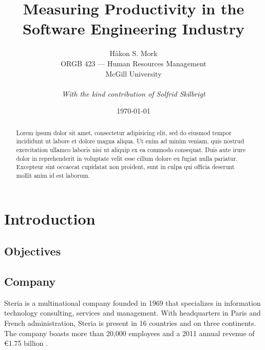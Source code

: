 \documentclass[letterpaper, 12pt]{report}
\title{\Huge \textbf{%
Measuring Productivity in the Software Engineering Industry}}
\author{
	Håkon S. Mork \\ 
	ORGB 423 --- Human Resources Management \\ 
	McGill University \\
	\\
	\emph{With the kind contribution of Solfrid Skilbrigt}
}
\date{\today}
\begin{document}
\maketitle

\begin{abstract}
Lorem ipsum dolor sit amet, consectetur adipisicing elit, sed do eiusmod tempor incididunt ut labore et dolore magna aliqua. Ut enim ad minim veniam, quis nostrud exercitation ullamco laboris nisi ut aliquip ex ea commodo consequat. Duis aute irure dolor in reprehenderit in voluptate velit esse cillum dolore eu fugiat nulla pariatur. Excepteur sint occaecat cupidatat non proident, sunt in culpa qui officia deserunt mollit anim id est laborum.
\end{abstract}

\tableofcontents

\chapter{Introduction}
\section{Objectives}

\section{Company}
Steria is a multinational company founded in 1969 that specializes in information technology consulting, services and management. 
With headquarters in Paris and French administration, Steria is present in 16 countries and on three continents. 
The company boasts more than 20,000 employees and a 2011 annual revenue of €1.75 billion \parencite{steria:stats}.
\end{document}

